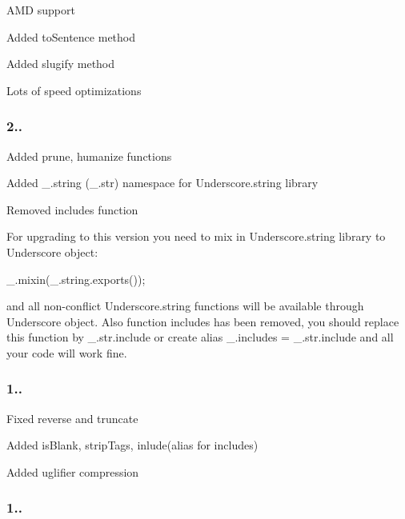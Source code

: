 \begin{DoxyItemize}
\item A\+MD support
\item Added to\+Sentence method
\item Added slugify method
\item Lots of speed optimizations
\end{DoxyItemize}

\subsubsection*{2..}


\begin{DoxyItemize}
\item Added prune, humanize functions
\item Added \+\_\+.\+string (\+\_\+.\+str) namespace for Underscore.\+string library
\item Removed includes function
\end{DoxyItemize}

For upgrading to this version you need to mix in Underscore.\+string library to Underscore object\+:


\begin{DoxyCode}
\_.mixin(\_.string.exports());
\end{DoxyCode}


and all non-\/conflict Underscore.\+string functions will be available through Underscore object. Also function {\ttfamily includes} has been removed, you should replace this function by {\ttfamily \+\_\+.\+str.\+include} or create alias {\ttfamily \+\_\+.\+includes = \+\_\+.\+str.\+include} and all your code will work fine.

\subsubsection*{1..}


\begin{DoxyItemize}
\item Fixed reverse and truncate
\item Added is\+Blank, strip\+Tags, inlude(alias for includes)
\item Added uglifier compression
\end{DoxyItemize}

\subsubsection*{1..}


